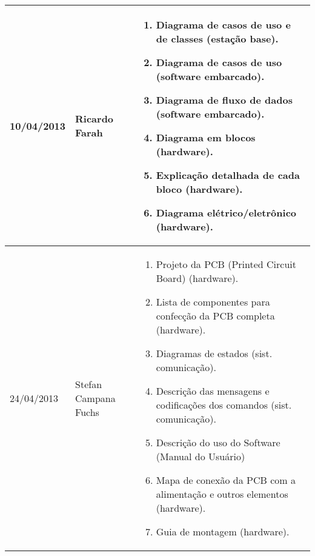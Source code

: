 \begin{table}[h]
  \centering
  \begin{tabular}{p{3cm}|p{4cm}||p{7cm}}
    10/04/2013 & Ricardo Farah & 
    \begin{enumerate}[topsep=0pt, partopsep=0pt, itemsep=0pt]
      \item Diagrama de casos de uso e de classes (estação base).
      \item Diagrama de casos de uso (software embarcado).
      \item Diagrama de fluxo de dados (software embarcado).
      \item Diagrama em blocos (hardware).
      \item Explicação detalhada de cada bloco (hardware).
      \item Diagrama elétrico/eletrônico (hardware).
    \end{enumerate}\\
    \hline
    24/04/2013 & Stefan Campana Fuchs & 
    \begin{enumerate}[topsep=0pt, partopsep=0pt, itemsep=0pt]
      \item Projeto da PCB (Printed Circuit Board) (hardware).
      \item Lista de componentes para confecção da PCB completa (hardware).
      \item Diagramas de estados (sist. comunicação).
      \item Descrição das mensagens e codificações dos comandos (sist. comunicação).
      \item Descrição do uso do Software (Manual do Usuário)
      \item Mapa de conexão da PCB com a alimentação e outros elementos (hardware).
      \item Guia de montagem (hardware).
    \end{enumerate}\\
    \bottomrule
  \end{tabular}%
  \label{tab:deliverables2}%
\end{table}%
